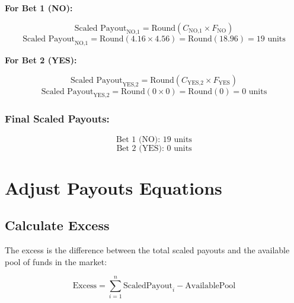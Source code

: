 \documentclass{article}
\begin{document}
\textbf{For Bet 1 (NO):}

\[
\text{Scaled Payout}_{\text{NO,1}} = \text{Round}(C_{\text{NO,1}} \times F_{\text{NO}})
\]
\[
\text{Scaled Payout}_{\text{NO,1}} = \text{Round}(4.16 \times 4.56) = \text{Round}(18.96) = 19 \text{ units}
\]

\textbf{For Bet 2 (YES):}

\[
\text{Scaled Payout}_{\text{YES,2}} = \text{Round}(C_{\text{YES,2}} \times F_{\text{YES}})
\]
\[
\text{Scaled Payout}_{\text{YES,2}} = \text{Round}(0 \times 0) = \text{Round}(0) = 0 \text{ units}
\]

\subsubsection*{Final Scaled Payouts:}
\[
\text{Bet 1 (NO): } 19 \text{ units}
\]
\[
\text{Bet 2 (YES): } 0 \text{ units}
\]

\begin{center}
\end{center}

\section*{Adjust Payouts Equations}

\subsection*{Calculate Excess}

The excess is the difference between the total scaled payouts and the available pool of funds in the market:

\[
\text{Excess} = \sum_{i=1}^{n} \text{ScaledPayout}_i - \text{AvailablePool}
\]
\end{document}
